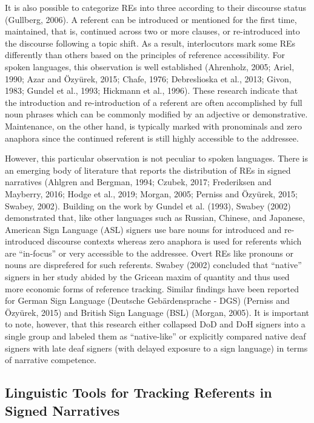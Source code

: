 \documentclass[]{elsarticle} %
\begin{document}
It is also possible to categorize REs into three according to their
discourse status (Gullberg, 2006). A referent can be introduced or
mentioned for the first time, maintained, that is, continued across two
or more clauses, or re-introduced into the discourse following a topic
shift. As a result, interlocutors mark some REs differently than others
based on the principles of reference accessibility. For spoken
languages, this observation is well established (Ahrenholz, 2005; Ariel,
1990; Azar and Özyürek, 2015; Chafe, 1976; Debreslioska et al., 2013;
Givon, 1983; Gundel et al., 1993; Hickmann et al., 1996). These research
indicate that the introduction and re-introduction of a referent are
often accomplished by full noun phrases which can be commonly modified
by an adjective or demonstrative. Maintenance, on the other hand, is
typically marked with pronominals and zero anaphora since the continued
referent is still highly accessible to the addressee.

However, this particular observation is not peculiar to spoken
languages. There is an emerging body of literature that reports the
distribution of REs in signed narratives (Ahlgren and Bergman, 1994;
Czubek, 2017; Frederiksen and Mayberry, 2016; Hodge et al., 2019;
Morgan, 2005; Perniss and Özyürek, 2015; Swabey, 2002). Building on the
work by Gundel et al. (1993), Swabey (2002) demonstrated that, like
other languages such as Russian, Chinese, and Japanese, American Sign
Language (ASL) signers use bare nouns for introduced and re-introduced
discourse contexts whereas zero anaphora is used for referents which are
``in-focus'' or very accessible to the addressee. Overt REs like
pronouns or nouns are disprefered for such referents. Swabey (2002)
concluded that ``native'' signers in her study abided by the Gricean
maxim of quantity and thus used more economic forms of reference
tracking. Similar findings have been reported for German Sign Language
(Deutsche Gebärdensprache - DGS) (Perniss and Özyürek, 2015) and British
Sign Language (BSL) (Morgan, 2005). It is important to note, however,
that this research either collapsed DoD and DoH signers into a single
group and labeled them as ``native-like'' or explicitly compared native
deaf signers with late deaf signers (with delayed exposure to a sign
language) in terms of narrative competence.

\hypertarget{linguistic-tools-for-tracking-referents-in-signed-narratives}{%
\subsection{Linguistic Tools for Tracking Referents in Signed
Narratives}\label{linguistic-tools-for-tracking-referents-in-signed-narratives}}
\end{document}
